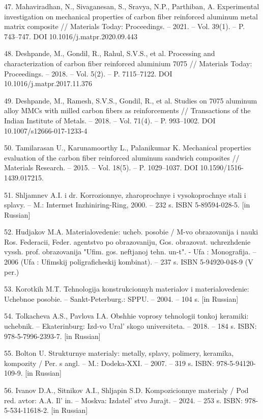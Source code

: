 \begin{references}
47. Mahaviradhan, N., Sivaganesan, S., Sravya, N.P., Parthiban, A.
Experimental investigation on mechani\-cal properties of carbon fiber
reinforced aluminum metal matrix composite // Materials Today:
Proceedings. -- 2021. -- Vol. 39(1). -- P. 743--747. DOI
10.1016/j.matpr.2020.09.443

48. Deshpande, M., Gondil, R., Rahul, S.V.S., et al. Processing and
characterization of carbon fiber reinfor\-ced aluminium 7075 // Materials
Today: Proceedings. -- 2018. -- Vol. 5(2). -- P. 7115--7122. DOI\\
10.1016/j.matpr.2017.11.376

49. Deshpande, M., Ramesh, S.V.S., Gondil, R., et al. Studies on 7075
aluminum alloy MMCs with milled carbon fibers as reinforcements //
Transactions of the Indian Institute of Metals. -- 2018. -- Vol. 71(4).
-- P. 993--1002. DOI 10.1007/s12666-017-1233-4

50. Tamilarasan U., Karunamoorthy L., Palanikumar K. Mechanical
properties evaluation of the carbon fiber reinforced aluminum sandwich
composites // Materials Research. -- 2015. -- Vol. 18(5). -- P.
1029--1037. DOI 10.1590/1516-1439.017215.

51. Shljamnev A.I. i dr. Korrozionnye, zharoprochnye i vysokoprochnye
stali i splavy. -- M.: Intermet Inzhiniring-Ring, 2000. -- 232 s. ISBN
5-89594-028-5. {[}in Russian{]}

52. Hudjakov M.A. Materialovedenie: ucheb. posobie / M-vo obrazovanija i
nauki Ros. Federacii, Feder. agentstvo po obrazovaniju, Gos. obrazovat.
uchrezhdenie vyssh. prof. obrazovanija "Ufim. gos. neftjanoj tehn.
un-t". - Ufa : Monografija. -- 2006 (Ufa : Ufimskij poligraficheskij
kombinat). -- 237 s. ISBN 5-94920-048-9 (V per.)

53. Korotkih M.T. Tehnologija konstrukcionnyh materialov i
materialovedenie: Uchebnoe posobie. -- Sankt-Peterburg.: SPPU. -- 2004.
-- 104 s. {[}in Russian{]}

54. Tolkacheva A.S., Pavlova I.A. Obshhie voprosy tehnologii tonkoj
keramiki: uchebnik. -- Ekaterinburg: Izd-vo Ural' skogo
universiteta. -- 2018. -- 184 s. ISBN: 978-5-7996-2393-7. {[}in
Russian{]}

55. Bolton U. Strukturnye materialy: metally, splavy, polimery,
keramika, kompozity / Per. s angl. -- M.: Dodeka-XXI. -- 2007. -- 319 s.
ISBN: 978-5-94120-109-9. {[}in Russian{]}

56. Ivanov D.A., Sitnikov A.I., Shljapin S.D. Kompozicionnye materialy /
Pod red. avtor: A.A. Il' in. -- Moskva:
Izdatel' stvo Jurajt. -- 2024. -- 253 s. ISBN:
978-5-534-11618-2. {[}in Russian{]}


\end{references}
